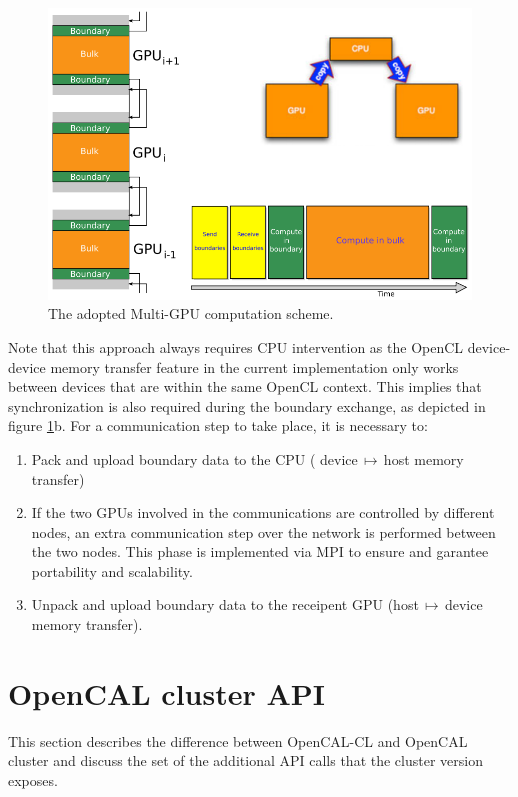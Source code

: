 \begin{figure}
	\centering
		\includegraphics[width=1.0\textwidth]{./images/opencal/multigpu_naive_exchange.png}
		\caption{The adopted Multi-GPU computation scheme.}
		\label{fig:multigpu_naive_exchange}
\end{figure}


Note that this approach always requires CPU intervention as the OpenCL device-device memory transfer feature in the current implementation only works between devices that are within the same OpenCL context. This implies that synchronization is also required during the boundary exchange, as depicted in figure \ref{fig:multigpu_naive_exchange}b.
For a communication step to take place, it is necessary to:
\begin{enumerate}
	\item Pack and upload boundary data to the CPU ( device$\,\mapsto\,$host  memory transfer)
	\item If the two GPUs involved in the communications are controlled by different nodes, an extra communication step over the network is performed between the two nodes. This phase is implemented via MPI \cite{mpiStandard:1994} to ensure and garantee portability and scalability. 
	\item Unpack and upload boundary data to the receipent GPU (host$\,\mapsto\,$device memory transfer).
\end{enumerate}


\section{OpenCAL cluster API}
This section describes the difference between OpenCAL-CL and OpenCAL cluster and discuss the set of the additional API calls that the cluster version exposes.

